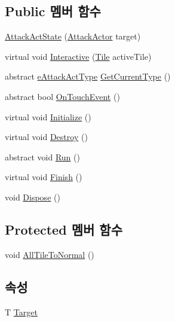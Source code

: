 \subsection*{Public 멤버 함수}
\begin{DoxyCompactItemize}
\item 
\hyperlink{class_attack_actor_1_1_attack_act_state_ab084b28b7bfaec2033a5102a48303af5}{Attack\+Act\+State} (\hyperlink{class_attack_actor}{Attack\+Actor} target)
\item 
virtual void \hyperlink{class_attack_actor_1_1_attack_act_state_a2ae9dd2f7ec8db76d25d7ad7ed58b89d}{Interactive} (\hyperlink{class_tile}{Tile} active\+Tile)
\item 
abstract \hyperlink{_attack_actor_8cs_a10659ce944335df4ded984f6bc41f31b}{e\+Attack\+Act\+Type} \hyperlink{class_attack_actor_1_1_attack_act_state_a8657ce92996ace441bb68b9e3002aa56}{Get\+Current\+Type} ()
\item 
abstract bool \hyperlink{class_attack_actor_1_1_attack_act_state_aa5e1794a3ede54c3b71a1463bf5b79a4}{On\+Touch\+Event} ()
\item 
virtual void \hyperlink{class_f_z_1_1_state_a27ac6fd2e844476017b35aa781d73c8c}{Initialize} ()
\item 
virtual void \hyperlink{class_f_z_1_1_state_aa85fdf4a5495d6d5d3ed4aeda3497c8a}{Destroy} ()
\item 
abstract void \hyperlink{class_f_z_1_1_state_acaf1584680a2e69e2a4da20574723981}{Run} ()
\item 
virtual void \hyperlink{class_f_z_1_1_state_a288bb8c3fceee4bf03f01e295dcef1be}{Finish} ()
\item 
void \hyperlink{class_f_z_1_1_state_a598887d3fbb412fada132dc1c079b25b}{Dispose} ()
\end{DoxyCompactItemize}
\subsection*{Protected 멤버 함수}
\begin{DoxyCompactItemize}
\item 
void \hyperlink{class_attack_actor_1_1_attack_act_state_a993762ec959af926e416f03fa7b71203}{All\+Tile\+To\+Normal} ()
\end{DoxyCompactItemize}
\subsection*{속성}
\begin{DoxyCompactItemize}
\item 
T \hyperlink{class_f_z_1_1_state_a6927f5c9f2517052f9dc5596188e9d95}{Target}
\end{DoxyCompactItemize}


